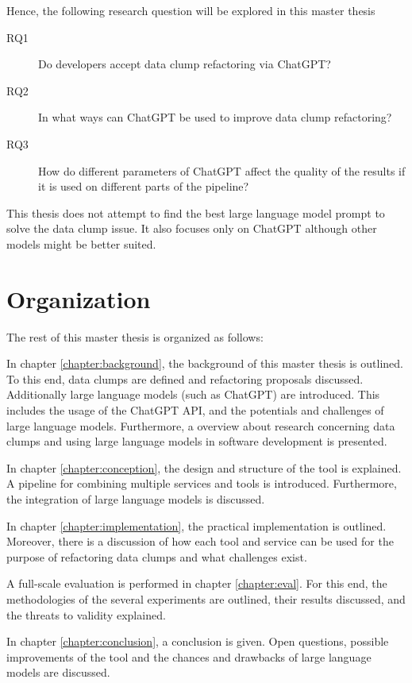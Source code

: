 Hence, the following research question will be explored in this master thesis

\begin{description}
    \item [RQ1] Do developers accept data clump refactoring via ChatGPT?
    \item [RQ2] In what ways can ChatGPT be used to improve data clump refactoring?
    \item [RQ3] How do different parameters of ChatGPT affect the quality of the results if it is used on different parts of the pipeline?
\end{description}
This thesis does not attempt to find the best large language model prompt to solve the data clump issue. It also focuses only on ChatGPT although other models might be better suited. 
\section{Organization}
The rest of this master thesis is organized as follows:

In chapter \ref{chapter:background}, the background of this master thesis  is outlined. To this end, data clumps are defined and refactoring proposals discussed. Additionally large language models (such as ChatGPT) are introduced. This includes the usage of the ChatGPT \ac{API}, and the potentials and challenges of large language models.  Furthermore, a overview about research  concerning data clumps and using large language models in software development is presented. 

In chapter \ref{chapter:conception}, the design and structure of the tool is explained. A pipeline for combining multiple services and tools is introduced. Furthermore, the integration of large language models is discussed. 

In chapter \ref{chapter:implementation}, the practical implementation is outlined.  Moreover, there is a discussion of how each tool and service can be used for the purpose of refactoring data clumps and what challenges exist. 

A full-scale evaluation is performed in chapter \ref{chapter:eval}. For this end, the methodologies of the several experiments  are outlined, their results discussed, and the threats to validity explained. 

In chapter \ref{chapter:conclusion}, a conclusion is given. Open questions, possible improvements of the tool and the chances and drawbacks of large language models are discussed.